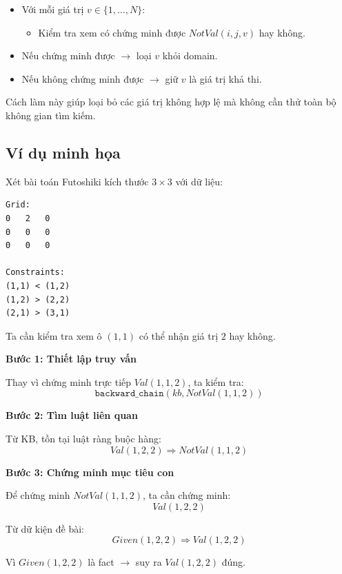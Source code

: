 \begin{itemize}
    \item Với mỗi giá trị $v \in \{1,\dots,N\}$:
    \begin{itemize}
        \item Kiểm tra xem có chứng minh được $NotVal(i,j,v)$ hay không.
    \end{itemize}
    
    \item Nếu chứng minh được $\rightarrow$ loại $v$ khỏi domain.
    
    \item Nếu không chứng minh được $\rightarrow$ giữ $v$ là giá trị khả thi.
\end{itemize}

Cách làm này giúp loại bỏ các giá trị không hợp lệ mà không cần thử toàn bộ không gian tìm kiếm.

\subsection{Ví dụ minh họa}

Xét bài toán Futoshiki kích thước $3 \times 3$ với dữ liệu:

\begin{tcolorbox}[colback=gray!5, colframe=black, title=Ví dụ 3x3]
\begin{verbatim}
Grid:
0   2   0
0   0   0
0   0   0

Constraints:
(1,1) < (1,2)
(1,2) > (2,2)
(2,1) > (3,1)
\end{verbatim}
\end{tcolorbox}

Ta cần kiểm tra xem ô $(1,1)$ có thể nhận giá trị $2$ hay không.

\textbf{Bước 1: Thiết lập truy vấn}

Thay vì chứng minh trực tiếp $Val(1,1,2)$, ta kiểm tra:
\[
\texttt{backward\_chain}(kb, NotVal(1,1,2))
\]

\textbf{Bước 2: Tìm luật liên quan}

Từ KB, tồn tại luật ràng buộc hàng:
\[
Val(1,2,2) \Rightarrow NotVal(1,1,2)
\]

\textbf{Bước 3: Chứng minh mục tiêu con}

Để chứng minh $NotVal(1,1,2)$, ta cần chứng minh:
\[
Val(1,2,2)
\]

Từ dữ kiện đề bài:
\[
Given(1,2,2) \Rightarrow Val(1,2,2)
\]

Vì $Given(1,2,2)$ là fact $\rightarrow$ suy ra $Val(1,2,2)$ đúng.

